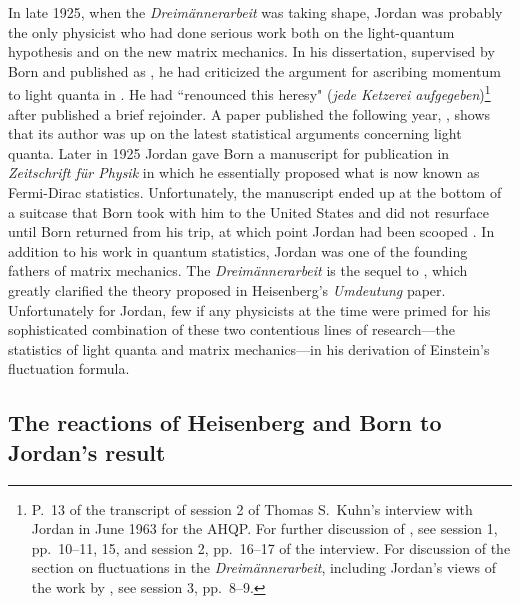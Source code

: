 \documentclass{elsart}
\begin{document}
In late 1925, when the {\it Dreim\"annerarbeit} was taking shape, Jordan was probably the only physicist  who had done serious work both on the light-quantum hypothesis and on the new matrix mechanics. In his dissertation, supervised by Born and published as \citep{Jordan 1924}, he had criticized the argument for ascribing momentum to light quanta in \citep{Einstein 1917}. He had ``renounced this heresy" ({\it jede Ketzerei aufgegeben})\footnote{P.\ 13 of the transcript of session 2 of 
Thomas S.\ Kuhn's 
 interview with Jordan in June 1963 for the AHQP.
For further discussion of \citep{Jordan 1924, Jordan 1925}, see session 1, pp.\ 10--11, 15, and session 2, pp.\ 16--17 of the interview. For discussion of the section on fluctuations in the {\it Dreim\"annerarbeit}, including Jordan's views of the work by \citet{Bothe 1923, Bothe 1924}, see session 3, pp.\ 8--9.}  after \citet{Einstein 1925} published a brief rejoinder. A paper published the following year, \citep{Jordan 1925}, shows that its author was up on the latest statistical arguments concerning light quanta. Later in 1925 Jordan gave Born a manuscript for publication in {\it Zeitschrift f\"ur Physik} in which he essentially proposed what is now known as Fermi-Dirac statistics. Unfortunately, the manuscript ended up at the bottom of a suitcase that Born took with him to the United States and did not resurface until Born returned from his trip, at which point Jordan had been scooped \citep[p.\ 49]{Schroer 2007}. In addition to his work in quantum statistics, Jordan was one of the founding fathers of matrix mechanics. The {\it Dreim\"annerarbeit} is the sequel to \citep{Born and Jordan 1925}, which greatly clarified the theory proposed in Heisenberg's {\it Umdeutung} paper. Unfortunately for Jordan, few if any physicists at the time were primed for his sophisticated combination of these two contentious lines of research---the statistics of light quanta and matrix mechanics---in his derivation of Einstein's fluctuation formula.

\subsection{The reactions of Heisenberg and Born to Jordan's result}
\end{document}
